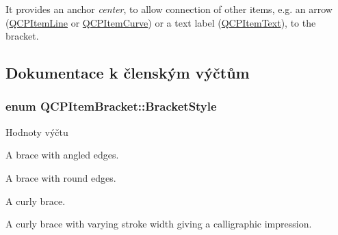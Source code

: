 It provides an anchor {\itshape center}, to allow connection of other items, e.\+g. an arrow (\hyperlink{classQCPItemLine}{Q\+C\+P\+Item\+Line} or \hyperlink{classQCPItemCurve}{Q\+C\+P\+Item\+Curve}) or a text label (\hyperlink{classQCPItemText}{Q\+C\+P\+Item\+Text}), to the bracket. 

\subsection{Dokumentace k členským výčtům}
\hypertarget{classQCPItemBracket_a7ac3afd0b24a607054e7212047d59dbd}{}
\subsubsection[{Bracket\+Style}]{\setlength{\rightskip}{0pt plus 5cm}enum {\bf Q\+C\+P\+Item\+Bracket\+::\+Bracket\+Style}}\label{classQCPItemBracket_a7ac3afd0b24a607054e7212047d59dbd}
\begin{Desc}
\item[Hodnoty výčtu]\par
\begin{description}
\item[{\em 
\hypertarget{classQCPItemBracket_a7ac3afd0b24a607054e7212047d59dbda7f9df4a7359bfe3dac1dbe4ccf5d220c}{}bs\+Square\label{classQCPItemBracket_a7ac3afd0b24a607054e7212047d59dbda7f9df4a7359bfe3dac1dbe4ccf5d220c}
}]A brace with angled edges. \item[{\em 
\hypertarget{classQCPItemBracket_a7ac3afd0b24a607054e7212047d59dbda394627b0830a26ee3e0a02ca67a9f918}{}bs\+Round\label{classQCPItemBracket_a7ac3afd0b24a607054e7212047d59dbda394627b0830a26ee3e0a02ca67a9f918}
}]A brace with round edges. \item[{\em 
\hypertarget{classQCPItemBracket_a7ac3afd0b24a607054e7212047d59dbda5024ce4023c2d8de4221f1cd4816acd8}{}bs\+Curly\label{classQCPItemBracket_a7ac3afd0b24a607054e7212047d59dbda5024ce4023c2d8de4221f1cd4816acd8}
}]A curly brace. \item[{\em 
\hypertarget{classQCPItemBracket_a7ac3afd0b24a607054e7212047d59dbda8f29f5ef754e2dc9a9efdedb2face0f3}{}bs\+Calligraphic\label{classQCPItemBracket_a7ac3afd0b24a607054e7212047d59dbda8f29f5ef754e2dc9a9efdedb2face0f3}
}]A curly brace with varying stroke width giving a calligraphic impression. \end{description}
\end{Desc}



